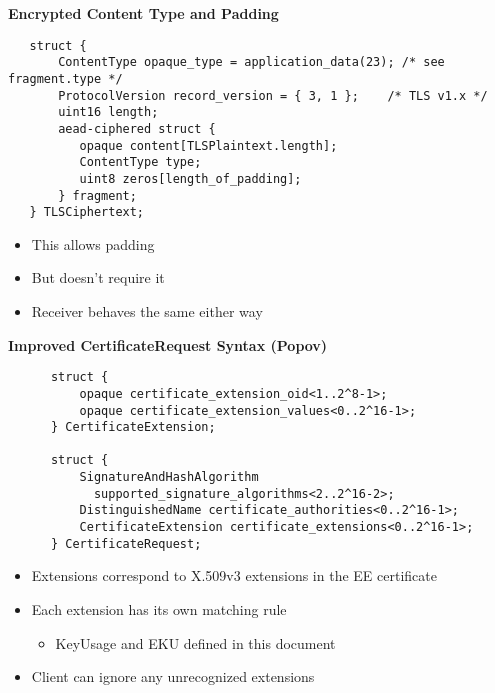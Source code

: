 \documentclass[helvetica]{seminar}
\newcommand{\heading}[1]{%
  \begin{center} 
    \large\bf 
    #1 
  \end{center} 
  \vspace{.4 in}}
\begin{document}
\begin{slide}
\heading{Encrypted Content Type and Padding}

\begin{footnotesize}
\begin{verbatim}
   struct {
       ContentType opaque_type = application_data(23); /* see fragment.type */
       ProtocolVersion record_version = { 3, 1 };    /* TLS v1.x */
       uint16 length;
       aead-ciphered struct {
          opaque content[TLSPlaintext.length];
          ContentType type;
          uint8 zeros[length_of_padding];
       } fragment;
   } TLSCiphertext;
\end{verbatim}
\end{footnotesize}

\begin{itemize}
\item This allows padding
\item But doesn't require it
\item Receiver behaves the same either way
\end{itemize}
\end{slide}


\begin{slide}
\heading{Improved CertificateRequest Syntax (Popov)}

\vspace{-3ex}
\begin{footnotesize}
\begin{verbatim}
      struct {
          opaque certificate_extension_oid<1..2^8-1>;
          opaque certificate_extension_values<0..2^16-1>;
      } CertificateExtension;

      struct {
          SignatureAndHashAlgorithm
            supported_signature_algorithms<2..2^16-2>;
          DistinguishedName certificate_authorities<0..2^16-1>;
          CertificateExtension certificate_extensions<0..2^16-1>;
      } CertificateRequest;
\end{verbatim}
\end{footnotesize}

\begin{itemize}
\item Extensions correspond to X.509v3 extensions in the EE certificate
\item Each extension has its own matching rule
  \begin{itemize}
  \item KeyUsage and EKU defined in this document
  \end{itemize}
\item Client can ignore any unrecognized extensions
\end{itemize}

\end{slide}
\end{document}
